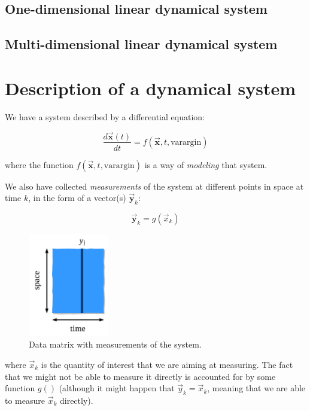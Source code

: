 \documentclass[10pt,twocolumn]{article}
\begin{document}
\subsection{One-dimensional linear dynamical system}


\subsection{Multi-dimensional linear dynamical system}


\section{Description of a dynamical system}

We have a system described by a differential equation:

\begin{equation} \label{eq:system_DE}
\frac{d \vec{\bm{x}}(t)}{dt} = f(\vec{\bm{x}}, t, \text{varargin})
\end{equation}

where the function $f(\vec{\bm{x}}, t, \text{varargin})$ is a way of \textit{modeling} that system.

We also have collected \textit{measurements} of the system at different points in space at time $k$, in the form of a vector(s) $\vec{\bm{y}}_k$:

\begin{equation}
\vec{\bm{y}}_k = g(\vec{x}_k)
\end{equation}

\begin{figure}
\centering\includegraphics[width=3.5cm]{data-matrix.png}
\caption{Data matrix with measurements of the system.}
\label{fig:data-matrix}
\end{figure}

where $\vec{x}_k$ is the quantity of interest that we are aiming at measuring. The fact that we might not be able to measure it directly is accounted for by some function $g()$ (although it might happen that $\vec{y}_k = \vec{x}_k$, meaning that we are able to measure $\vec{x}_k$ directly).
\end{document}
